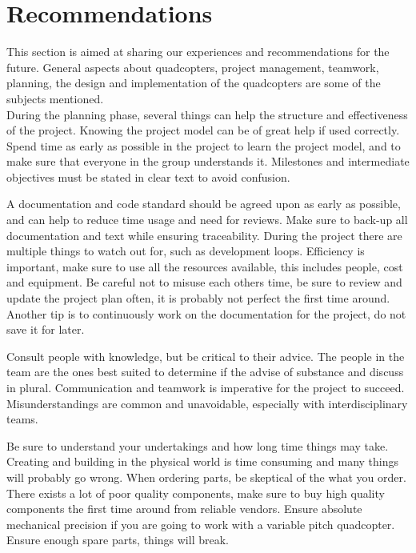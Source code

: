\chapter{Recommendations}
This section is aimed at sharing our experiences and recommendations for the future. General aspects about quadcopters, project management, teamwork, planning, the design and implementation of the quadcopters are some of the subjects mentioned. \\

During the planning phase, several things can help the structure and effectiveness of the project. Knowing the project model can be of great help if used correctly. Spend time as early as possible in the project to learn the project model, and to make sure that everyone in the group understands it. Milestones and intermediate objectives must be stated in clear text to avoid confusion.\bigskip 

A documentation and code standard should be agreed upon as early as possible, and can help to reduce time usage and need for reviews. Make sure to back-up all documentation and text while ensuring traceability. During the project there are multiple things to watch out for, such as development loops. Efficiency is important, make sure to use all the resources available, this includes people, cost and equipment. Be careful not to misuse each others time, be sure to review and update the project plan often, it is probably not perfect the first time around. Another tip is to continuously work on the documentation for the project, do not save it for later. \bigskip

Consult people with knowledge, but be critical to their advice. The people in the team are the ones best suited to determine if the advise of substance and discuss in plural. Communication and teamwork is imperative for the project to succeed. Misunderstandings are common and unavoidable, especially with interdisciplinary teams.\bigskip 

Be sure to understand your undertakings and how long time things may take. Creating and building in the physical world is time consuming and many things will probably go wrong. When ordering parts, be skeptical of the what you order. There exists a lot of poor quality components, make sure to buy high quality components the first time around from reliable vendors. Ensure absolute mechanical precision if you are going to work with a variable pitch quadcopter. Ensure enough spare parts, things will break.\\

